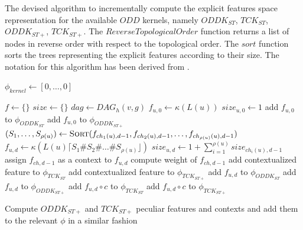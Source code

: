 \begin{algorithm}
    \caption{The devised algorithm to incrementally compute the explicit
    features space representation for the available $ODD$ kernels, namely
    $ODDK_{ST}$, $TCK_{ST}$, $ODDK_{ST+}$, $TCK_{ST+}$.
    The $ReverseTopologicalOrder$ function returns a list of nodes in reverse
    order with respect to the topological order.
    The $sort$ function sorts the trees representing the explicit features
    according to their size.
    The notation for this algorithm has been derived from \cite{rtesselli}.
    }
    \label{alg:incremental}
    \begin{algorithmic}[1]
            \State $\phi_{kernel} \gets [0,\dots,0]$
        \EndFor

            \State $f \gets \{\}$
            \State $size \gets \{\}$
            \State $dag \gets DAG_h(v, g)$
                        \State $f_{u,0} \gets \kappa(L(u))$
                        \State $size_{u,0} \gets 1$
                        \State add $f_{u,0}$ to $\phi_{ODDK_{ST}}$
                        \State add $f_{u,0}$ to $\phi_{ODDK_{ST+}}$
                    \Else
                        \State $(S_1,\dots,S_{\rho(u)}) \gets \Call{Sort}{
                        f_{ch_1(u),d-1},f_{ch_2(u),d-1},\dots,f_{ch_{\rho(u)}(u),d-1}}$
                        \State $f_{u,d} \gets \kappa(L(u)\lceil{}S_1\#S_2\#\dots\#S_{\rho(u)}\rfloor)$
                        \State $size_{u,d} \gets 1 + \sum_{i=1}^{\rho(u)}size_{ch_i(u),d-1}$
                            \State assign $f_{ch,d-1}$ as a context to $f_{u,d}$
                            \State compute weight of $f_{ch,d-1}$
                            \State add contextualized feature to $\phi_{TCK_{ST}}$
                            \State add contextualized feature to $\phi_{TCK_{ST+}}$
                        \EndFor
                        \State add $f_{u,d}$ to $\phi_{ODDK_{ST}}$
                        \State add $f_{u,d}$ to $\phi_{ODDK_{ST+}}$
                    \EndIf
                        \State add $f_{u,d}\circ{}c$ to $\phi_{TCK_{ST}}$
                        \State add $f_{u,d}\circ{}c$ to $\phi_{TCK_{ST+}}$
                    \EndIf

                    \State Compute $ODDK_{ST+}$ and $TCK_{ST+}$ peculiar features
                    and contexts and add them to the relevant $\phi$ in a similar
                    fashion\label{line:stp}
                \EndFor
            \EndFor
        \EndFor
    \end{algorithmic}
\end{algorithm}

